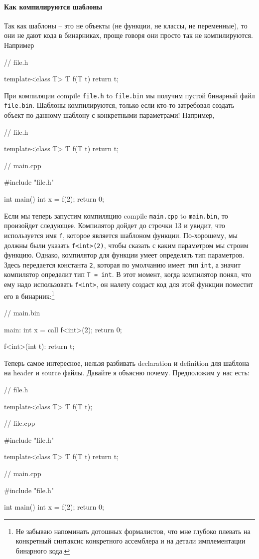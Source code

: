 \documentclass{article}
\begin{document}
\paragraph{Как компилируются шаблоны}
Так как шаблоны -- это не объекты (не функции, не классы, не переменные), то они не дают кода в бинарниках, проще говоря они просто так не компилируются. Например
\begin{cppcode}
// file.h

template<class T>
T f(T t) {
  return t;
}
\end{cppcode}
При компиляции compile \verb"file.h" to \verb"file.bin" мы получим пустой бинарный файл \verb"file.bin". Шаблоны компилируются, только если кто-то затребовал создать объект по данному шаблону с конкретными параметрами! Например,
\begin{cppcode}
// file.h

template<class T>
T f(T t) {
  return t;
}

// main.cpp

#include "file.h"

int main() {
  int x = f(2);
  return 0;
}
\end{cppcode}
Если мы теперь запустим компиляцию compile \verb"main.cpp" to \verb"main.bin", то произойдет следующее. Компилятор дойдет до строчки 13 и увидит, что используется имя \verb"f", которое является шаблоном функции. По-хорошему, мы должны были указать \verb"f<int>(2)", чтобы сказать с каким параметром мы строим функцию. Однако, компилятор для функции умеет определять тип параметров. Здесь передается константа \verb"2", которая по умолчанию имеет тип \verb"int", а значит компилятор определит тип \verb"T = int". В этот момент, когда компилятор понял, что ему надо использовать \verb"f<int>", он налету создаст код для этой функции поместит его в бинарник:\footnote{Не забываю напоминать дотошных формалистов, что мне глубоко плевать на конкретный синтаксис конкретного ассемблера и на детали имплементации бинарного кода.}
\begin{cppcode}
// main.bin

main:
  int x = call f<int>(2);
  return 0;

f<int>(int t):
  return t;
\end{cppcode}
Теперь самое интересное, нельзя разбивать declaration и definition для шаблона на header и source файлы. Давайте я объясню почему. Предположим у нас есть:
\begin{cppcode}
// file.h

template<class T>
T f(T t);

// file.cpp

#include "file.h"

template<class T>
T f(T t) {
  return t;
}

// main.cpp

#include "file.h"

int main() {
  int x = f(2);
  return 0;
}
\end{cppcode}
\end{document}
